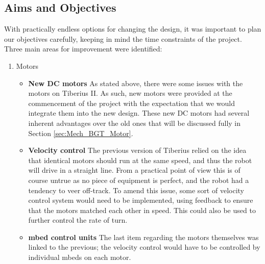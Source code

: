 \subsection{Aims and Objectives}
With practically endless options for changing the design, it was important to plan our objectives carefully, keeping in mind the time constraints of the project. Three main areas for improvement were identified:

\begin{enumerate}
\item Motors
\begin{itemize}
\item \textbf{New DC motors}
\newline
As stated above, there were some issues with the motors on Tiberius II. As such, new motors were provided at the commencement of the project with the expectation that we would integrate them into the new design. These new DC motors had several inherent advantages over the old ones that will be discussed fully in Section \ref{sec:Mech_BGT_Motor}.

\item \textbf{Velocity control}
\newline
The previous version of Tiberius relied on the idea that identical motors should run at the same speed, and thus the robot will drive in a straight line. From a practical point of view this is of course untrue as no piece of equipment is perfect, and the robot had a tendency to veer off-track. To amend this issue, some sort of velocity control system would need to be implemented, using feedback to ensure that the motors matched each other in speed. This could also be used to further control the rate of turn.
        
\item \textbf{mbed control units}
\newline
The last item regarding the motors themselves was linked to the previous; the velocity control would have to be controlled by individual mbeds on each motor.
\end{itemize}


\end{enumerate}
